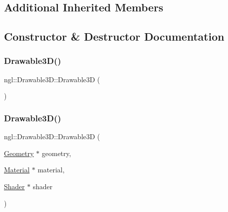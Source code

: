 \subsection*{Additional Inherited Members}


\subsection{Constructor \& Destructor Documentation}
\mbox{\label{classngl_1_1_drawable3_d_aae58fdd01a433a383c72d45254444df0}} 
\subsubsection{\texorpdfstring{Drawable3\+D()}{Drawable3D()}\hspace{0.1cm}{\footnotesize\ttfamily [1/2]}}
{\footnotesize\ttfamily ngl\+::\+Drawable3\+D\+::\+Drawable3D (\begin{DoxyParamCaption}{ }\end{DoxyParamCaption})\hspace{0.3cm}{\ttfamily [explicit]}}

\mbox{\label{classngl_1_1_drawable3_d_a83e551fb4b952afa0bdd6b0704682434}} 
\subsubsection{\texorpdfstring{Drawable3\+D()}{Drawable3D()}\hspace{0.1cm}{\footnotesize\ttfamily [2/2]}}
{\footnotesize\ttfamily ngl\+::\+Drawable3\+D\+::\+Drawable3D (\begin{DoxyParamCaption}\item[{\mbox{\hyperlink{classngl_1_1_geometry}{Geometry}} $\ast$}]{geometry,  }\item[{\mbox{\hyperlink{classngl_1_1_material}{Material}} $\ast$}]{material,  }\item[{\mbox{\hyperlink{classngl_1_1_shader}{Shader}} $\ast$}]{shader }\end{DoxyParamCaption})\hspace{0.3cm}{\ttfamily [explicit]}}

